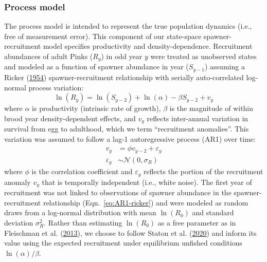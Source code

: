 \documentclass[11pt]{book}
\begin{document}
\hypertarget{process-model}{%
\subsubsection{Process model}\label{process-model}}

The process model is intended to represent the true population dynamics (i.e., free of measurement error). This component of our state-space spawner-recruitment model specifies productivity and density-dependence. Recruitment abundances of adult Pinks (\(R_y\)) in odd year \(y\) were treated as unobserved states and modeled as a function of spawner abundance in year (\(S_{y-1}\)) assuming a Ricker (\protect\hyperlink{ref-rickerStockRecruitment1954}{1954}) spawner-recruitment relationship with serially auto-correlated log-normal process variation:
\begin{equation}
\ln(R_y) = \ln(S_{y-2}) + \ln(\alpha) - \beta S_{y-2} + v_y
\label{eq:AR1-ricker}
\end{equation}
where \(\alpha\) is productivity (intrinsic rate of growth), \(\beta\) is the magnitude of within brood year density-dependent effects, and \(v_y\) reflects inter-annual variation in survival from egg to adulthood, which we term ``recruitment anomalies''. This variation was assumed to follow a lag-1 autoregressive process (AR1) over time:
\begin{equation}
\begin{aligned}
v_y &= \phi v_{y-2} + \varepsilon_y \\
\varepsilon_y &\sim \mathcal{N}(0, \sigma_R)
\end{aligned}
\label{eq:AR1}
\end{equation}
where \(\phi\) is the correlation coefficient and \(\varepsilon_y\) reflects the portion of the recruitment anomaly \(v_y\) that is temporally independent (i.e., white noise). The first year of recruitment was not linked to observations of spawner abundance in the spawner-recruitment relationship (Eqn.~\ref{eq:AR1-ricker}) and were modeled as random draws from a log-normal distribution with mean \(\ln(R_0)\) and standard deviation \(\sigma_{R}^2\). Rather than estimating \(\ln(R_0)\) as a free parameter as in Fleischman et al. (\protect\hyperlink{ref-fleischmanAgestructuredStatespaceStock2013}{2013}), we choose to follow Staton et al. (\protect\hyperlink{ref-statonEvaluationMethodsSpawner2020}{2020}) and inform its value using the expected recruitment under equilibrium unfished conditions \(\ln(\alpha)/\beta\).
\end{document}
